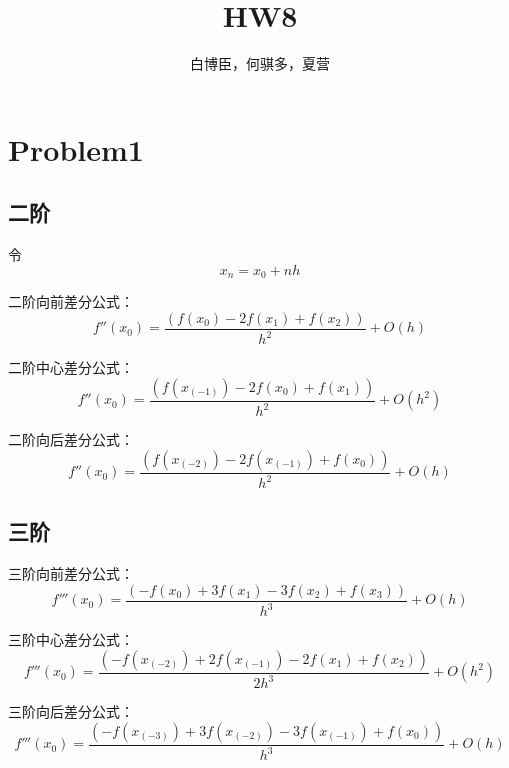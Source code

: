 \documentclass[UTF8]{ctexart}
\begin{document}
    \title{\textbf{HW8}}
    \author{白博臣，何骐多，夏营}
    \date{}
    \maketitle


    \section{Problem1}\label{sec:1}
    \subsection{二阶}\label{subsec:1.1}


    令
    \begin{equation*}
        x_n=x_0+nh
    \end{equation*}

    二阶向前差分公式：
    \begin{equation*}
        f'' (x_0 ) = \frac{(f(x_0 ) - 2f(x_1 ) + f(x_2))}{h^2} +O(h)
    \end{equation*}

    二阶中心差分公式：
    \begin{equation*}
        f'' (x_0 ) = \frac{(f(x_(-1) ) - 2f(x_0 ) + f(x_1))}{h^2} +O(h^2)
    \end{equation*}

    二阶向后差分公式：
    \begin{equation*}
        f'' (x_0 ) = \frac{(f(x_(-2) ) - 2f(x_(-1) ) + f(x_0 ))}{h^2 }+O(h)
    \end{equation*}

    \subsection{三阶}\label{subsec:1.2}


    三阶向前差分公式：
    \begin{equation*}
        f''' (x_0 ) = \frac{(-f(x_0 ) + 3f(x_1 ) - 3f(x_2 ) + f(x_3 ))}{h^3} +O(h)
    \end{equation*}

    三阶中心差分公式：
    \begin{equation*}
        f''' (x_0 ) = \frac{(-f(x_(-2) ) + 2f(x_(-1) ) - 2f(x_1 ) + f(x_2 ))}{2h^3} +O(h^2 )
    \end{equation*}

    三阶向后差分公式：
    \begin{equation*}
        f''' (x_0 ) = \frac{(-f(x_(-3) ) + 3f(x_(-2) ) -3 f(x_(-1) ) + f(x_0 ))}{h^3} +O(h)
    \end{equation*}
\end{document}

